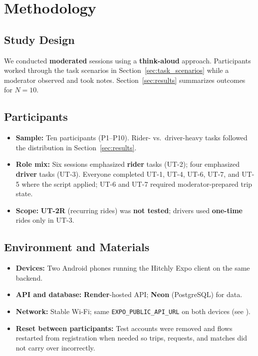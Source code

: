 \section{Methodology}
\label{sec:methodology}

\subsection{Study Design}

We conducted \textbf{moderated} sessions using a \textbf{think-aloud} approach. Participants worked through the task scenarios in Section~\ref{sec:task_scenarios} while a moderator observed and took notes. Section~\ref{sec:results} summarizes outcomes for $N=10$.

\subsection{Participants}

\begin{itemize}
  \item \textbf{Sample:} Ten participants (P1--P10). Rider- vs.\ driver-heavy tasks followed the distribution in Section~\ref{sec:results}.
  \item \textbf{Role mix:} Six sessions emphasized \textbf{rider} tasks (UT-2); four emphasized \textbf{driver} tasks (UT-3). Everyone completed UT-1, UT-4, UT-6, UT-7, and UT-5 where the script applied; UT-6 and UT-7 required moderator-prepared trip state.
  \item \textbf{Scope:} \textbf{UT-2R} (recurring rides) was \textbf{not tested}; drivers used \textbf{one-time} rides only in UT-3.
\end{itemize}

\subsection{Environment and Materials}

\begin{itemize}
  \item \textbf{Devices:} Two Android phones running the Hitchly Expo client on the same backend.
  \item \textbf{API and database:} \textbf{Render}-hosted API; \textbf{Neon} (PostgreSQL) for data.
  \item \textbf{Network:} Stable Wi-Fi; same \texttt{EXPO\_PUBLIC\_API\_URL} on both devices (see ).
  \item \textbf{Reset between participants:} Test accounts were removed and flows restarted from registration when needed so trips, requests, and matches did not carry over incorrectly.
\end{itemize}

